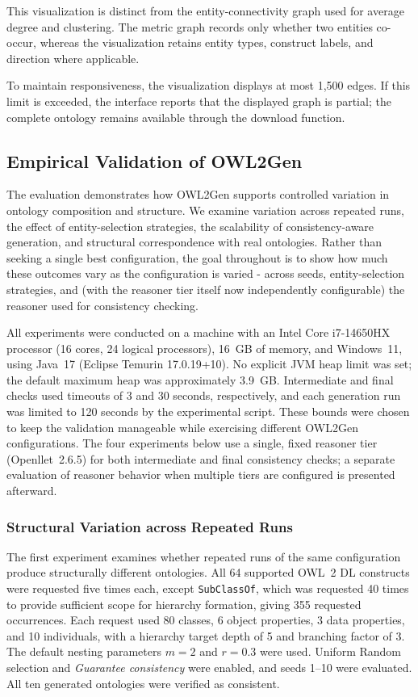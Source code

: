 This visualization is distinct from the entity-connectivity graph used for
average degree and clustering. The metric graph records only whether two
entities co-occur, whereas the visualization retains entity types,
construct labels, and direction where applicable.

To maintain responsiveness, the visualization displays at most 1,500
edges. If this limit is exceeded, the interface reports that the displayed
graph is partial; the complete ontology remains available through the
download function.


\subsection{Empirical Validation of OWL2Gen}
\label{sec:owl2gen_evaluation}

The evaluation demonstrates how OWL2Gen supports controlled variation in
ontology composition and structure. We examine variation across repeated
runs, the effect of entity-selection strategies, the scalability of
consistency-aware generation, and structural correspondence with real
ontologies. Rather than seeking a single best configuration, the goal
throughout is to show how much these outcomes vary as the configuration is
varied - across seeds, entity-selection strategies, and (with the reasoner
tier itself now independently configurable) the reasoner used for
consistency checking.

All experiments were conducted on a machine with an Intel Core i7-14650HX
processor (16 cores, 24 logical processors), 16~GB of memory, and Windows~11,
using Java~17 (Eclipse Temurin 17.0.19+10). No explicit JVM heap limit was
set; the default maximum heap was approximately 3.9~GB. Intermediate and
final checks used timeouts of 3 and 30 seconds, respectively, and each
generation run was limited to 120 seconds by the experimental script. These
bounds were chosen to keep the validation manageable while exercising
different OWL2Gen configurations. The four experiments below use a single,
fixed reasoner tier (Openllet~2.6.5) for both intermediate and final
consistency checks; a separate evaluation of reasoner behavior when
multiple tiers are configured is presented afterward.


\subsubsection{Structural Variation across Repeated Runs}

The first experiment examines whether repeated runs of the same configuration
produce structurally different ontologies. All 64 supported OWL~2 DL
constructs were requested five times each, except \texttt{SubClassOf}, which
was requested 40 times to provide sufficient scope for hierarchy formation,
giving 355 requested occurrences. Each request used 80 classes, 6 object
properties, 3 data properties, and 10 individuals, with a hierarchy target
depth of 5 and branching factor of 3. The default nesting parameters $m=2$
and $r=0.3$ were used. Uniform Random selection and \emph{Guarantee
consistency} were enabled, and seeds 1--10 were evaluated. All ten generated
ontologies were verified as consistent.

